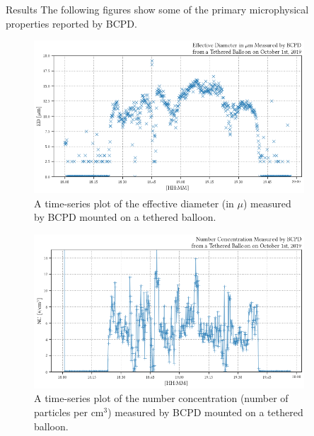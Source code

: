 \documentclass[final]{beamer}
\newlength{\sepwidth}
\newlength{\colwidth}
\newcommand{\separatorcolumn}{\begin{column}{\sepwidth}\end{column}}
\begin{document}
\begin{frame}[t]
\begin{columns}[t]
\begin{column}{\colwidth}
    \end{column}

    \separatorcolumn
    \begin{column}{\colwidth}

      \begin{block}{Results}
        The following figures show some of the primary microphysical properties reported by BCPD.

        \begin{figure}
          \centering
          \includegraphics[width=\colwidth]{figure/ts_ed.png}
          \caption{A time-series plot of the effective diameter (in $\mu$) measured by BCPD mounted on a tethered balloon.}
        \end{figure}

        \begin{figure}
          \centering
          \includegraphics[width=\colwidth]{figure/ts_nc.png}
          \caption{A time-series plot of the number concentration (number of particles per cm$^3$) measured by BCPD mounted on a tethered balloon.}
        \end{figure}


\end{block}
\end{column}
\end{columns}
\end{frame}
\end{document}
